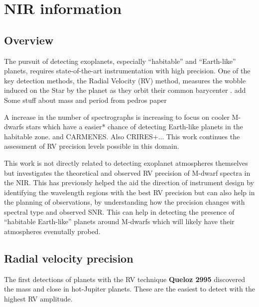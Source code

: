 
\chapter{NIR information}

\label{cha:nir_content}

\section{Overview}

The pursuit of detecting exoplanets, especially ``habitable'' and ``Earth-like'' planets, requires state-of-the-art instrumentation with high precision. One of the key detection methods, the Radial Velocity (RV) method, measures the wobble induced on the Star by the planet as they orbit their common barycenter .  {\red{} add Some stuff about mass and period from pedros paper}



A increase in the number of \nir{} spectrographs is increasing to focus on cooler M-dwarfs stars which have a easier* chance of detecting Earth-like planets in the habitable zone.  and CARMENES. Also CRIRES+...
This work continues the assessment of RV precision levels possible in this domain.




This work is not directly related to detecting exoplanet atmospheres themselves but investigates the theoretical and observed RV precision of M-dwarf spectra in the NIR. This has previously helped the aid the direction of instrument design by identifying the wavelength regions with the best RV precision \citep{figueira_radial_2016} but can also help in the planning of observations, by understanding how the precision changes with spectral type and observed SNR. This can help in detecting the presence of ``habitable Earth-like'' planets around M-dwarfs which will likely have their atmospheres evenutally probed.


\section{Radial velocity precision}
The first detections of planets with the RV technique \textbf{Queloz 2995} discovered the mass and close in hot-Jupiter planets. These are the easiest to detect with the highest RV amplitude.

